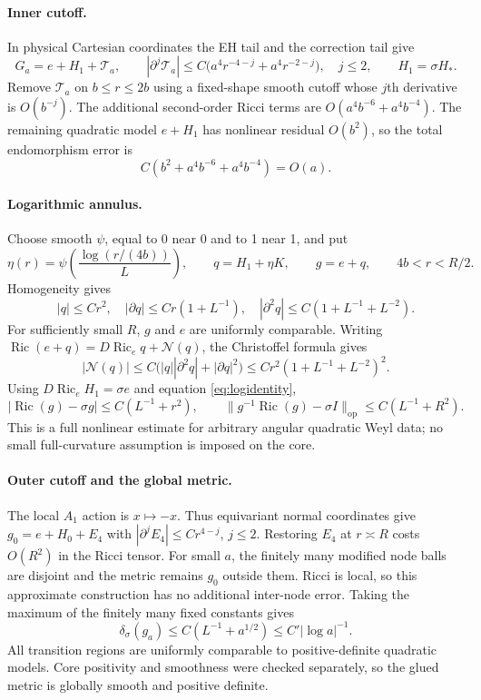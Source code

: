 \documentclass[a4paper,11pt]{article}
\numberwithin{equation}{section}
\theoremstyle{definition}
\newcommand{\Ric}{\operatorname{Ric}}
\newcommand{\op}{\mathrm{op}}
\begin{document}
\paragraph{Inner cutoff.}
In physical Cartesian coordinates the EH tail and the correction tail give
\[
G_a=e+H_1+\mathcal T_a,\qquad
|\partial^j\mathcal T_a|
\le C\bigl(a^4r^{-4-j}+a^4r^{-2-j}\bigr),\quad j\le2,
\qquad H_1=\sigma H_*.
\]
Remove $\mathcal T_a$ on $b\le r\le2b$ using a fixed-shape smooth cutoff
whose $j$th derivative is $O(b^{-j})$.
The additional second-order Ricci terms are
$O(a^4b^{-6}+a^4b^{-4})$.
The remaining quadratic model $e+H_1$ has nonlinear residual $O(b^2)$, so the total endomorphism error is
\begin{equation}\label{eq:innercutoff}
C(b^2+a^4b^{-6}+a^4b^{-4})=O(a).
\end{equation}

\paragraph{Logarithmic annulus.}
Choose smooth $\psi$, equal to 0 near 0 and to 1 near 1, and put
\[
\eta(r)=\psi\!\left(\frac{\log(r/(4b))}{L}\right),\qquad
q=H_1+\eta K,\qquad g=e+q,\qquad 4b<r<R/2.
\]
Homogeneity gives
\[
|q|\le Cr^2,\quad
|\partial q|\le Cr(1+L^{-1}),\quad
|\partial^2q|\le C(1+L^{-1}+L^{-2}).
\]
For sufficiently small $R$, $g$ and $e$ are uniformly comparable. Writing
$\Ric(e+q)=D\Ric_e q+\mathcal N(q)$, the Christoffel formula gives
\[
|\mathcal N(q)|\le C\bigl(|q||\partial^2q|+|\partial q|^2\bigr)
\le Cr^2(1+L^{-1}+L^{-2})^2.
\]
Using $D\Ric_eH_1=\sigma e$ and equation \eqref{eq:logidentity},
\[
|\Ric(g)-\sigma g|
\le C(L^{-1}+r^2),\qquad
\|g^{-1}\Ric(g)-\sigma I\|_{\op}
\le C(L^{-1}+R^2).
\]
This is a full nonlinear estimate for arbitrary angular quadratic Weyl data; no small full-curvature assumption is imposed on the core.

\paragraph{Outer cutoff and the global metric.}
The local $A_1$ action is $x\mapsto-x$. Thus equivariant normal coordinates give
$g_0=e+H_0+E_4$ with
$|\partial^jE_4|\le Cr^{4-j}$, $j\le2$.
Restoring $E_4$ at $r\asymp R$ costs $O(R^2)$ in the Ricci tensor.
For small $a$, the finitely many modified node balls are disjoint and the metric remains $g_0$ outside them.
Ricci is local, so this approximate construction has no additional inter-node error.
Taking the maximum of the finitely many fixed constants gives
\[
\delta_\sigma(g_a)\le C(L^{-1}+a^{1/2})
\le C'|\log a|^{-1}.
\]
All transition regions are uniformly comparable to positive-definite quadratic models. Core positivity and smoothness were checked separately, so the glued metric is globally smooth and positive definite.
\end{document}
